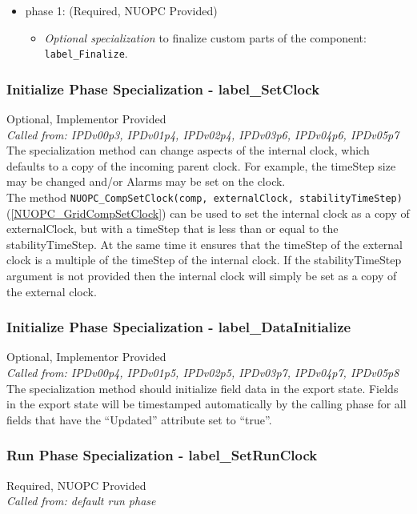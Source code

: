 \begin{itemize}
\item phase 1: ({\sc Required, NUOPC Provided})
  \begin{itemize}
  \item {\it Optional specialization} to finalize custom parts of the component: {\tt label\_Finalize}.
  \end{itemize}      
\end{itemize}

\subsubsection{Initialize Phase Specialization - label\_SetClock}
{\sc Optional, Implementor Provided}\\
{\em Called from: IPDv00p3, IPDv01p4, IPDv02p4, IPDv03p6, IPDv04p6, IPDv05p7}\\

The specialization method can change aspects of the internal clock, which defaults to a copy of the incoming parent clock. For example, the timeStep size may be changed and/or Alarms may be set on the clock.\\

The method {\tt NUOPC\_CompSetClock(comp, externalClock, stabilityTimeStep)} (\ref{NUOPC_GridCompSetClock}) can be used to set the internal clock as a copy of externalClock, but with a timeStep that is less than or equal to the stabilityTimeStep. At the same time it ensures that the timeStep of the external clock is a multiple of the timeStep of the internal clock. If the stabilityTimeStep argument is not provided then the internal clock will simply be set as a copy of the external clock.

\subsubsection{Initialize Phase Specialization - label\_DataInitialize}
{\sc Optional, Implementor Provided}\\
{\em Called from: IPDv00p4, IPDv01p5, IPDv02p5, IPDv03p7, IPDv04p7, IPDv05p8}\\

The specialization method should initialize field data in the export state. Fields in the export state will be timestamped automatically by the calling phase for all fields that have the ``Updated'' attribute set to ``true''.

\subsubsection{Run Phase Specialization - label\_SetRunClock}
{\sc Required, NUOPC Provided}\\
{\em Called from: default run phase}\\

